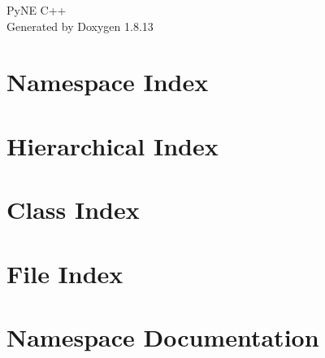\documentclass[twoside]{book}
\newcommand{\+}{\discretionary{\mbox{\scriptsize$\hookleftarrow$}}{}{}}
\newcommand{\clearemptydoublepage}{%
  \newpage{\pagestyle{empty}\cleardoublepage}%
}
\begin{document}
\hypersetup{pageanchor=false,
             bookmarksnumbered=true,
             pdfencoding=unicode
            }
\begin{titlepage}
\vspace*{7cm}
\begin{center}%
{\Large Py\+NE C++ }\\
\vspace*{1cm}
{\large Generated by Doxygen 1.8.13}\\
\end{center}
\end{titlepage}
\clearemptydoublepage
{}
\tableofcontents
\clearemptydoublepage
{}
\hypersetup{pageanchor=true}

\chapter{Namespace Index}

\chapter{Hierarchical Index}

\chapter{Class Index}

\chapter{File Index}

\chapter{Namespace Documentation}








\end{document}
